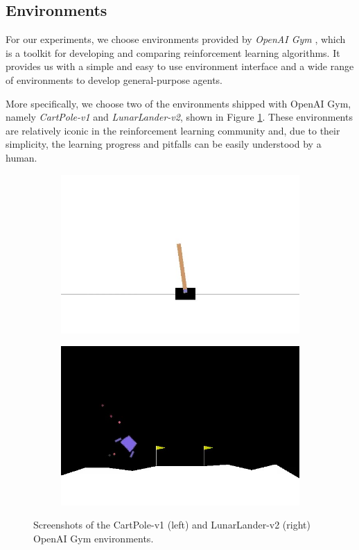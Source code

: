 \subsection{Environments}
For our experiments, we choose environments provided by \textit{OpenAI Gym} \cite{gym}, which is a toolkit for developing and comparing reinforcement learning algorithms. It provides us with a simple and easy to use environment interface and a wide range of environments to develop general-purpose agents.

More specifically, we choose two of the environments shipped with OpenAI Gym, namely \textit{CartPole-v1} and \textit{LunarLander-v2}, shown in Figure \ref{fig:environments}. These environments are relatively iconic in the reinforcement learning community and, due to their simplicity, the learning progress and pitfalls can be easily understood by a human.
\begin{figure}[ht]
    \centering
    \begin{subfigure}{0.49\textwidth}
        \raggedleft
        \includegraphics[width=\textwidth]{assets/cartpole.jpg}
    \end{subfigure}
    \begin{subfigure}{0.5\textwidth}
        \raggedright
        \includegraphics[width=\textwidth]{assets/lunarlander.jpg}
    \end{subfigure}
    \caption{Screenshots of the CartPole-v1 (left) and LunarLander-v2 (right) OpenAI Gym environments.}
    \label{fig:environments}
\end{figure}
